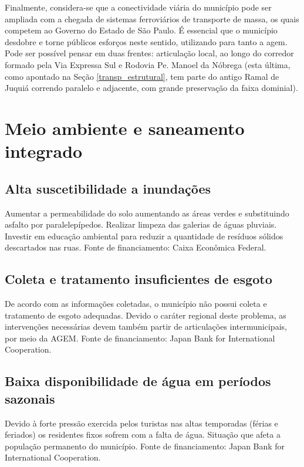 	Finalmente, considera-se que a conectividade viária do município pode ser ampliada com a chegada de sistemas ferroviários de transporte de massa, os quais competem ao Governo do Estado de São Paulo. É essencial que o município desdobre e torne públicos esforços neste sentido, utilizando para tanto a \gls{agem}. Pode ser possível pensar em duas frentes: articulação local, ao longo do corredor formado pela Via Expressa Sul e Rodovia Pe. Manoel da Nóbrega (esta última, como apontado na Seção \ref{transp_estrutural}, tem parte do antigo Ramal de Juquiá correndo paralelo e adjacente, com grande preservação da faixa dominial).
	
	\section{Meio ambiente e saneamento integrado}
	
	\subsection{Alta suscetibilidade a inundações}
	
	Aumentar a permeabilidade do solo aumentando as áreas verdes e substituindo asfalto por paralelepípedos. Realizar limpeza das galerias de águas pluviais. Investir em educação ambiental para reduzir a quantidade de resíduos sólidos descartados nas ruas. Fonte de financiamento: Caixa Econômica Federal.
	
	\subsection{Coleta e tratamento insuficientes de esgoto}
	
	De acordo com as informações coletadas, o município não possui coleta e tratamento de esgoto adequadas. Devido o caráter regional deste problema, as intervenções necessárias devem também partir de articulações intermunicipais, por meio da AGEM.  Fonte de financiamento: Japan Bank for International Cooperation.
	
	\subsection{Baixa disponibilidade de água em períodos sazonais}
	
	Devido à forte pressão exercida pelos turistas nas altas temporadas (férias e feriados) os residentes fixos sofrem com a falta de água. Situação que afeta a população permanento do município. Fonte de financiamento:  Japan Bank for International Cooperation. 
	
